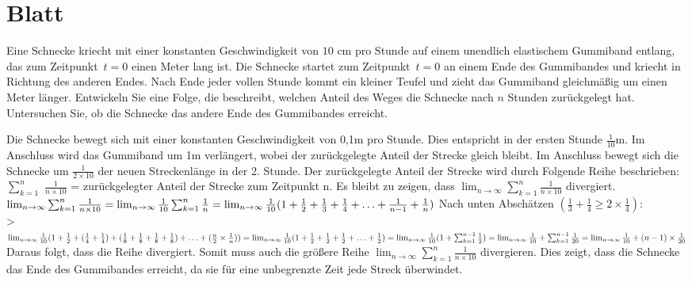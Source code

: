 \section{Blatt}

\begin{aufg}[6 Punkte] 
Eine Schnecke kriecht mit einer konstanten Geschwindigkeit von $10$ cm pro Stunde auf einem unendlich elastischem Gummiband entlang, das zum Zeitpunkt~$t=0$ einen Meter lang ist. Die Schnecke startet zum Zeitpunkt~$t=0$ an einem Ende des Gummibandes und kriecht in Richtung des anderen Endes. Nach Ende jeder vollen Stunde kommt ein kleiner Teufel und zieht das Gummiband gleichm\"a{\ss}ig um einen Meter l\"anger. Entwickeln Sie eine Folge, die beschreibt, welchen Anteil des Weges die Schnecke nach $n$ Stunden zur\"uckgelegt hat. Untersuchen Sie, ob die Schnecke das andere Ende des Gummibandes erreicht.
\end{aufg}

\bigskip

\begin{lsg} 
Die Schnecke bewegt sich mit einer konstanten Geschwindigkeit von 0,1m pro Stunde. Dies entspricht in der ersten Stunde $\frac{1}{10}$m. Im Anschluss wird das Gummiband um 1m verlängert, wobei der zurückgelegte Anteil der Strecke gleich bleibt. Im Anschluss bewegt sich die Schnecke um  $\frac{1}{2 \times 10}$ der neuen Streckenlänge in der 2. Stunde. 
Der zurückgelegte Anteil der Strecke wird durch Folgende Reihe beschrieben: 
$\sum\nolimits_{k=1}^n$ $\frac{1}{n \times 10} $ = zurückgelegter Anteil der Strecke zum Zeitpunkt n.
Es bleibt zu zeigen, dass $\lim_{n \to \infty} \sum\nolimits_{k=1}^n \frac{1}{n \times 10}$ divergiert.\\ 
$\lim_{n \to \infty} \sum\nolimits_{k=1}^n \frac{1}{n \times 10} \\ 
= \lim_{n \to \infty}  \frac{1}{10}\sum\nolimits_{k=1}^n \frac{1}{n} \\
= \lim_{n \to \infty} \frac{1}{10}(1+\frac{1}{2}+\frac{1}{3}+\frac{1}{4}+ \ldots+\frac{1}{n-1}+\frac{1}{n}) \\$
Nach unten Abschätzen $(\frac{1}{3}+\frac{1}{4}\geq 2 \times \frac{1}{4})$: \\
\textgreater \ $ \lim_{n \to \infty} \frac{1}{10} (1+\frac{1}{2}+ (\frac{1}{4}+\frac{1}{4})+(\frac{1}{8}+\frac{1}{8}+\frac{1}{8}+\frac{1}{8})+\ldots + (\frac{n}{2} \times \frac{1}{n})) \\
= \lim_{n \to \infty} \frac{1}{10} (1+\frac{1}{2}+\frac{1}{2}+\frac{1}{2}+\ldots +\frac{1}{2}) \\
= \lim_{n \to \infty} \frac{1}{10} (1+ \sum\nolimits_{k=1}^{n-1} \frac{1}{2})\\
=\lim_{n \to \infty} \frac{1}{10} + \sum\nolimits_{k=1}^{n-1} \frac{1}{20} \\
=\lim_{n \to \infty} \frac{1}{10} + (n-1) \times \frac{1}{20}$
Daraus folgt, dass die Reihe divergiert. Somit muss auch die größere Reihe 
$\lim_{n \to \infty} \sum\nolimits_{k=1}^n \frac{1}{n \times 10}$ divergieren.
Dies zeigt, dass die Schnecke das Ende des Gummibandes erreicht, da sie für eine unbegrenzte Zeit jede Streck überwindet. 
\end{lsg}

